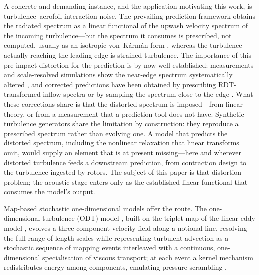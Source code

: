 \documentclass[lineno]{JFM-FLM_Au}
\begin{document}
A concrete and demanding instance, and the application motivating this
work, is turbulence--aerofoil interaction noise. The prevailing
prediction framework \citep{Amiet1975,PatersonAmiet1977,RogerMoreau2010}
obtains the radiated spectrum as a linear functional of the upwash
velocity spectrum of the incoming turbulence---but the spectrum it
consumes is prescribed, not computed, usually as an isotropic
von~K\'arm\'an form \citep{vonKarman1948}, whereas the turbulence
actually reaching the leading edge is strained turbulence. The
importance of this pre-impact distortion for the prediction is by now
well established: measurements and scale-resolved simulations show the
near-edge spectrum systematically altered
\citep{dosSantos2023,Ribeiro2023,Piccolo2024}, and corrected predictions
have been obtained by prescribing RDT-transformed inflow spectra
\citep{deSantana2016,dosSantos2023} or by sampling the spectrum close to
the edge \citep{Piccolo2024}. What these corrections share is that the
distorted spectrum is imposed---from linear theory, or from a
measurement that a prediction tool does not have. Synthetic-turbulence
generators \citep{KimHaeri2015} share the limitation by construction:
they reproduce a prescribed spectrum rather than evolving one. A model that predicts the distorted spectrum, including the nonlinear
relaxation that linear transforms omit, would supply an element that is
at present missing---here and wherever distorted turbulence feeds a
downstream prediction, from contraction design to the turbulence ingested
by rotors. The subject
of this paper is that distortion problem; the acoustic stage enters
only as the established linear functional that consumes the model's
output.

Map-based stochastic one-dimensional models offer the route. The
one-dimensional turbulence (ODT) model
\citep{Kerstein1999,Kerstein2001}, built on the triplet map of the
linear-eddy model \citep{Kerstein1991}, evolves a three-component
velocity field along a notional line, resolving the full range of length
scales while representing turbulent advection as a stochastic sequence
of mapping events interleaved with a continuous, one-dimensional
specialisation of viscous transport; at each event a kernel mechanism
redistributes energy among components, emulating pressure scrambling
\citep{WunschKerstein2001,Kerstein2001}.
\end{document}
